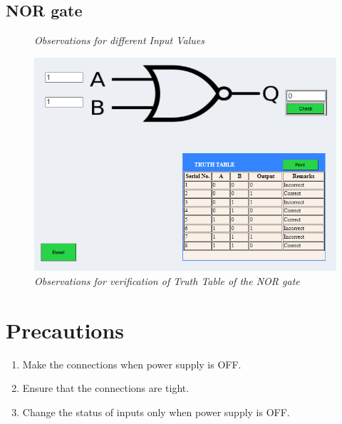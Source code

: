 \pagebreak
	\subsection{NOR gate}
			\begin{figure}[ht]
				\centering 
				\hfill
				\caption{\textit{Observations for different Input Values}}
			\end{figure}
			\begin{figure}[h]
				\centering
				\includegraphics[width=0.85\linewidth]{img/exp2/fig12}
				\caption{\textit{Observations for verification of Truth Table of the NOR gate}}
				\label{fig:nor_obs_2}
			\end{figure}
			
\section{Precautions}
	\begin{enumerate}
		\tightlist
		\item Make the connections when power supply is OFF.
		\item Ensure that the connections are tight.
		\item Change the status of inputs only when power supply is OFF.
	\end{enumerate}